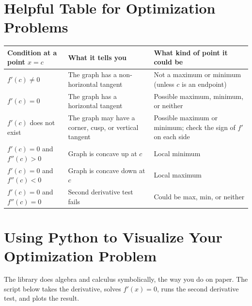 \section{Helpful Table for Optimization Problems}
\begin{center}
\begin{tabular}{|p{4cm}|p{6cm}|p{4cm}|}
\hline
\textbf{Condition at a point $x = c$} & \textbf{What it tells you} & \textbf{What kind of point it could be} \\
\hline
$f'(c) \neq 0$ &
The graph has a non-horizontal tangent &
Not a maximum or minimum (unless $c$ is an endpoint) \\
\hline
$f'(c) = 0$ &
The graph has a horizontal tangent &
Possible maximum, minimum, or neither \\
\hline
$f'(c)$ does not exist &
The graph may have a corner, cusp, or vertical tangent &
Possible maximum or minimum; check the sign of $f'$ on each side \\
\hline
$f'(c) = 0$ and $f''(c) > 0$ &
Graph is concave up at $c$ &
Local minimum \\
\hline
$f'(c) = 0$ and $f''(c) < 0$ &
Graph is concave down at $c$ &
Local maximum \\
\hline
$f'(c) = 0$ and $f''(c) = 0$ &
Second derivative test fails &
Could be max, min, or neither \\
\hline
\end{tabular}
\end{center}



\section{Using Python to Visualize Your Optimization Problem}
The  library does algebra and calculus symbolically,
the way you do on paper. The script below takes the derivative, solves
$f'(x) = 0$, runs the second derivative test, and plots the result.


